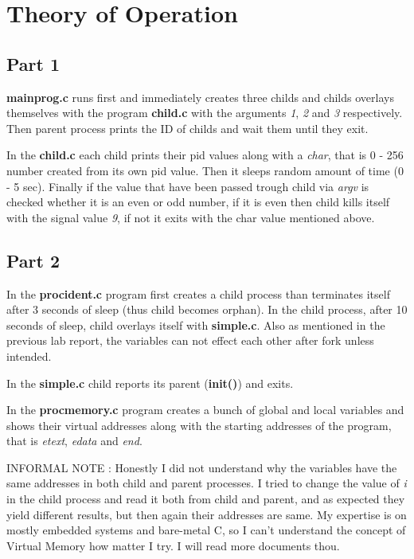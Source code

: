 \documentclass[11pt]{article}
\begin{document}
\section*{Theory of Operation}
\subsection*{Part 1}

\textbf{mainprog.c} runs first and immediately creates three childs and childs overlays themselves with the program \textbf{child.c} with the arguments \textit{1}, \textit{2} and \textit{3} respectively. Then parent process prints the ID of childs and wait them until they exit.

In the \textbf{child.c} each child prints their pid values along with a \textit{char}, that is 0 - 256 number created from its own pid value. Then it sleeps random amount of time (0 - 5 sec). Finally if the value that have been passed trough child via \textit{argv} is checked whether it is an even or odd number, if it is even then child kills itself with the signal value \textit{9}, if not it exits with the char value mentioned above.

\subsection*{Part 2}

In the \textbf{procident.c} program first creates a child process than terminates itself after 3 seconds of sleep (thus child becomes orphan). In the child process, after 10 seconds of sleep, child overlays itself with \textbf{simple.c}.  Also as mentioned in the previous lab report, the variables can not effect each other after fork unless intended. 

In the \textbf{simple.c} child reports its parent (\textbf{init()}) and exits.

In the \textbf{procmemory.c} program creates a bunch of global and local variables and shows their virtual addresses along with the starting addresses of the program, that is \textit{etext}, \textit{edata} and \textit{end}. 

INFORMAL NOTE : Honestly I did not understand why the variables have the same addresses in both child and parent processes. I tried to change the value of \textit{i} in the child process and read it both from child and parent, and as expected they yield different results, but then again their addresses are same. My expertise is on mostly embedded systems and bare-metal C, so I can't understand the concept of Virtual Memory how matter I try. I will read more documents thou.
\end{document}

